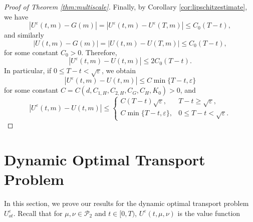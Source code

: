 \documentclass[reqno,11pt]{amsart}
\numberwithin{equation}{section}
\newcommand{\zd}[1]{{\color{brown}[ZD:#1]}}
\newcommand{\e}{\varepsilon}
\newcommand{\ep}{\varepsilon}
\newcommand{\nd}{\noindent}
\begin{document}
\begin{proof}[Proof of Theorem \ref{thm:multiscale}]
Finally, by Corollary \ref{cor:lipschitzestimate}, we have
\[
\left|U^\ep(t,m)-G(m)\right|=\left|U^\ep(t,m)-U^\ep(T,m)\right| \leq C_0(T-t),
\]
and similarly
\[
\left|U(t,m)-G(m)\right|=\left|U(t,m)-U(T,m)\right| \leq C_0(T-t),
\]
for some constant $C_0>0$. Therefore,
\[
\left|U^\ep(t,m)-U(t,m)\right|  \leq 2 C_0(T-t).
\]
In particular, if $0\leq T-t<\sqrt{\ep}$, we obtain
\[
\left|U^\ep(t,m)-U(t,m)\right| \leq C \min\{T-t, \ep\}
\]
for some constant $C=C(d,C_{1,H},C_{2,H},C_G, C_H,K_0)>0$, and
\[
\left|U^\ep(t,m)-U(t,m)\right|  \le
\begin{cases}
C(T-t)\sqrt{\varepsilon}, & T-t \ge \sqrt{\varepsilon},\\[4pt]
C\min\{T-t,\varepsilon\}, & 0\leq T-t<\sqrt{\varepsilon}.
\end{cases}
\]
\end{proof}







\section{Dynamic Optimal Transport Problem}\label{DOT}

\nd
In this section, we prove our results for the dynamic optimal transport problem $U^\e_{ot}$. Recall that for $\mu,\nu\in\mathcal{P}_2$ and $t\in [0,T)$, $U^\e(t,\mu,\nu)$ is the value function
\end{document}
